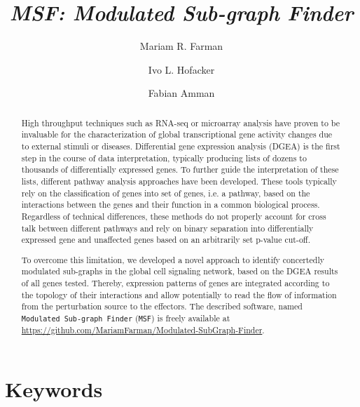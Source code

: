 \documentclass[10pt,a4paper,twocolumn]{article}
\begin{document}
\title{\textit{MSF: Modulated Sub-graph Finder} }

\author[1]{Mariam R. Farman}
\author[1]{Ivo L. Hofacker}
\author[1,2]{Fabian Amman}



\maketitle
\thispagestyle{fancy}

\begin{abstract}

High throughput techniques such as RNA-seq or microarray analysis have
proven to be invaluable for the characterization of global transcriptional
gene activity changes due to external stimuli or diseases. Differential
gene expression analysis (DGEA) is the first step in the course of data
interpretation, typically producing lists of dozens to thousands of
differentially expressed genes. To further guide the interpretation of
these lists, different pathway analysis approaches have been
developed. These tools typically rely on the classification of genes into
set of genes, i.e. a pathway, based on the interactions between the genes
and their function in a common biological process. Regardless of technical
differences, these methods do not properly account for cross talk between
different pathways and rely on binary separation into differentially
expressed gene and unaffected genes based on an arbitrarily set p-value
cut-off.

To overcome this limitation, we developed a novel approach to identify
concertedly modulated sub-graphs in the global cell signaling network,
based on the DGEA results of all genes tested. Thereby, expression patterns
of genes are integrated according to the topology of their interactions and
allow potentially to read the flow of information from the perturbation
source to the effectors. The described software, named \texttt{Modulated
  Sub-graph Finder} (\texttt{MSF}) is freely available at
\url{https://github.com/MariamFarman/Modulated-SubGraph-Finder}.

\end{abstract}

\section*{Keywords}
\end{document}
